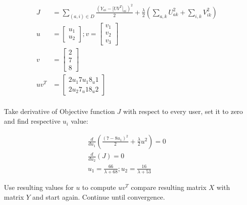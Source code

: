 \begin{align*}
\displaystyle J &= \sum _{(a,i) \in D} \frac{(Y_{ai} - \big [UV^ T\big ]_{ai})^2}{2} + \frac{\lambda }{2} \left(\sum _{a,k} U_{ak}^2 + \sum _{i,k} V_{ik}^2\right)\\
u&=
\begin{bmatrix}
u_1\\
u_2
\end{bmatrix};  
v=
\begin{bmatrix}
v_1\\
v_2\\
v_3
\end{bmatrix}\\
v&=
\begin{bmatrix}
2\\
7\\
8
\end{bmatrix}\\
uv^T& = \begin{bmatrix}
2u_1 7u_1 8_u1\\
2u_2 7_u1 8_u2
\end{bmatrix}\\
\end{align*}

Take derivative of Objective function $J$ with respect to every user, set it to zero and find respective $u_i$ value:

\begin{align*}
\frac{d}{du_1}( \frac{(7-8u_1)^2}{2} + \frac{\lambda}{2} u^2) = 0\\
\frac{d}{du_2}(J) = 0\\
u_1 = \frac{66}{\lambda + 68};
u_2 = \frac{16}{\lambda +53}
\end{align*}

Use resulting values for $u$ to compute $uv^T$ compare resulting matrix $X$ with matrix $Y$ and start again. Continue until convergence.